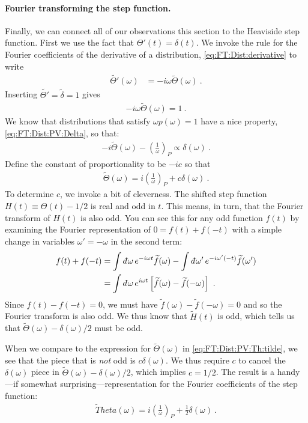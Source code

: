 \paragraph{Fourier transforming the step function.}
Finally, we can connect all of our observations this section to the Heaviside step function. First we use the fact that $\Theta'(t) = \delta(t)$. We invoke the rule for the Fourier coefficients of the derivative of a distribution, \eqref{eq:FT:Dist:derivative} to write
\begin{align}
	\tilde{\Theta'}(\omega) &= -i\omega \tilde \Theta(\omega) \ .
\end{align}
Inserting $\tilde{\Theta'}=\tilde\delta = 1$ gives
\begin{align}
	-i\omega\tilde \Theta(\omega) = 1 \ .
\end{align}
We know that distributions that satisfy $\omega p(\omega) =1$ have a nice property, \eqref{eq:FT:Dist:PV:Delta}, so that:
\begin{align}
	-i\tilde \Theta(\omega) - \left(\frac{1}{\omega}\right)_P \propto \delta(\omega) \ .
\end{align}
Define the constant of proportionality to be $-ic$ so that
\begin{align}
	\tilde \Theta(\omega) = 
	i\left(\frac{1}{\omega}\right)_P + c \delta(\omega) \ .
	\label{eq:FT:Dist:PV:Th:tilde}
\end{align}
To determine $c$, we invoke a bit of cleverness. The shifted step function $H(t)\equiv\Theta(t) - 1/2$ is real and odd in $t$. This means, in turn, that the Fourier transform of $H(t)$ is also odd. You can see this for any odd function $f(t)$ by examining the Fourier representation of $0=f(t)+f(-t)$ with a simple change in variables $\omega' = -\omega$ in the second term:
\begin{align}
	f(t)+f(-t) &= 
	\int \dbar \omega \,
 	e^{-i\omega t} \tilde f(\omega) 
	-
	\int \dbar \omega' \, e^{-i\omega'(-t)}  \tilde f(\omega') 
	\\&=
	\int \dbar\omega\, e^{i \omega t} 
	\left[\tilde f(\omega) - \tilde f(-\omega) \right] \ .
\end{align}
Since $f(t)-f(-t)=0$, we must have $\tilde f(\omega)- \tilde f(-\omega) =0$ and so the Fourier transform is also odd. We thus know that $\tilde H(t)$ is odd, which tells us that $\tilde\Theta(\omega) - \delta(\omega)/2$ must be odd. 

When we compare to the expression for $\tilde\Theta(\omega)$ in \eqref{eq:FT:Dist:PV:Th:tilde}, we see that the piece that is \emph{not} odd is $c\delta(\omega)$. We thus require $c$ to cancel the $\delta(\omega)$ piece in $\tilde\Theta(\omega) - \delta(\omega)/2$, which implies $c=1/2$. The result is a handy---if somewhat surprising---representation for the Fourier coefficients of the step function:
\begin{align}
	\tilde Theta(\omega) = i\left(\frac{1}{\omega}\right)_P + \frac{1}{2}\delta(\omega) \ .
\end{align}



